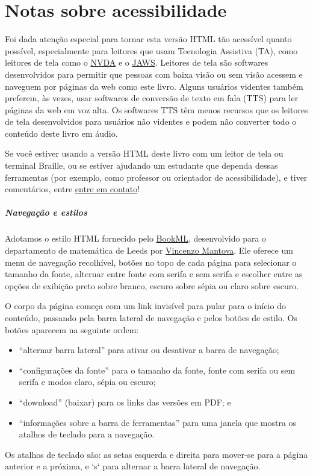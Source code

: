 
\chapter{Notas sobre acessibilidade}

Foi dada atenção especial para tornar esta versão HTML tão acessível quanto possível, especialmente para leitores que usam Tecnologia Assistiva (TA), como leitores de tela como o
\href{https://www.nvaccess.org/download/}{NVDA}
e o
\href{https://www.freedomscientific.com/products/software/jaws/}{JAWS}.
Leitores de tela são softwares desenvolvidos para permitir que pessoas com baixa visão ou sem visão acessem e naveguem por páginas da web como este livro. Alguns usuários videntes também preferem, às vezes, usar softwares de conversão de texto em fala (TTS) para ler páginas da web em voz alta. Os softwares TTS têm menos recursos que os leitores de tela desenvolvidos para usuários não videntes e podem não converter todo o conteúdo deste livro em áudio.

Se você estiver usando a versão HTML deste livro com um leitor de tela ou terminal Braille, ou se estiver ajudando um estudante que dependa dessas ferramentas (por exemplo, como professor ou orientador de acessibilidade), e tiver comentários, entre
\href{mailto:rzach@ucalgary.ca}{entre em contato}!

\paragraph{Navegação e estilos} Adotamos o estilo HTML fornecido pelo
\href{https://vlmantova.github.io/bookml/}{BookML},
desenvolvido para o departamento de matemática de Leeds por
\href{https://eps.leeds.ac.uk/maths/staff/4058/dr-vincenzo-l-mantova}{Vincenzo
Mantova}. Ele oferece um menu de navegação recolhível, botões no topo de cada página para selecionar o tamanho da fonte, alternar entre fonte com serifa e sem serifa e escolher entre as opções de exibição preto sobre branco, escuro sobre sépia ou claro sobre escuro.

O corpo da página começa com um link invisível para pular para o início do conteúdo, passando pela barra lateral de navegação e pelos botões de estilo. Os botões aparecem na seguinte ordem:
\begin{itemize}
  \item \textquotedblleft alternar barra lateral\textquotedblright{} para ativar ou desativar a barra de navegação;
  \item \textquotedblleft configurações da fonte\textquotedblright{} para o tamanho da fonte, fonte com serifa ou sem serifa e modos claro, sépia ou escuro;
  \item \textquotedblleft download\textquotedblright{} (baixar) para os links das versões em PDF; e
  \item \textquotedblleft informações sobre a barra de ferramentas\textquotedblright{} para uma janela que mostra os atalhos de teclado para a navegação.
\end{itemize}
Os atalhos de teclado são: as setas esquerda e direita para mover-se para a página anterior e a próxima, e `s` para alternar a barra lateral de navegação.


